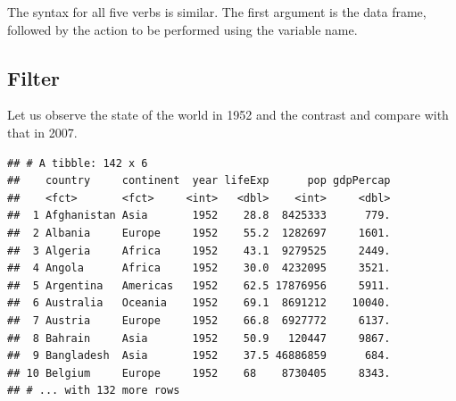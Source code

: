 \documentclass[11pt,]{article}
\newenvironment{Shaded}{\begin{snugshade}}{\end{snugshade}}
\newcommand{\KeywordTok}[1]{\textcolor[rgb]{0.13,0.29,0.53}{\textbf{#1}}}
\newcommand{\DecValTok}[1]{\textcolor[rgb]{0.00,0.00,0.81}{#1}}
\newcommand{\StringTok}[1]{\textcolor[rgb]{0.31,0.60,0.02}{#1}}
\newcommand{\CommentTok}[1]{\textcolor[rgb]{0.56,0.35,0.01}{\textit{#1}}}
\newcommand{\OperatorTok}[1]{\textcolor[rgb]{0.81,0.36,0.00}{\textbf{#1}}}
\newcommand{\NormalTok}[1]{#1}
\begin{document}
The syntax for all five verbs is similar. The first argument is the data
frame, followed by the action to be performed using the variable name.

\subsection{Filter}\label{filter}

Let us observe the state of the world in 1952 and the contrast and
compare with that in 2007.

\begin{Shaded}
\end{Shaded}

\begin{verbatim}
## # A tibble: 142 x 6
##    country     continent  year lifeExp      pop gdpPercap
##    <fct>       <fct>     <int>   <dbl>    <int>     <dbl>
##  1 Afghanistan Asia       1952    28.8  8425333      779.
##  2 Albania     Europe     1952    55.2  1282697     1601.
##  3 Algeria     Africa     1952    43.1  9279525     2449.
##  4 Angola      Africa     1952    30.0  4232095     3521.
##  5 Argentina   Americas   1952    62.5 17876956     5911.
##  6 Australia   Oceania    1952    69.1  8691212    10040.
##  7 Austria     Europe     1952    66.8  6927772     6137.
##  8 Bahrain     Asia       1952    50.9   120447     9867.
##  9 Bangladesh  Asia       1952    37.5 46886859      684.
## 10 Belgium     Europe     1952    68    8730405     8343.
## # ... with 132 more rows
\end{verbatim}

\begin{Shaded}
\end{Shaded}
\end{document}
